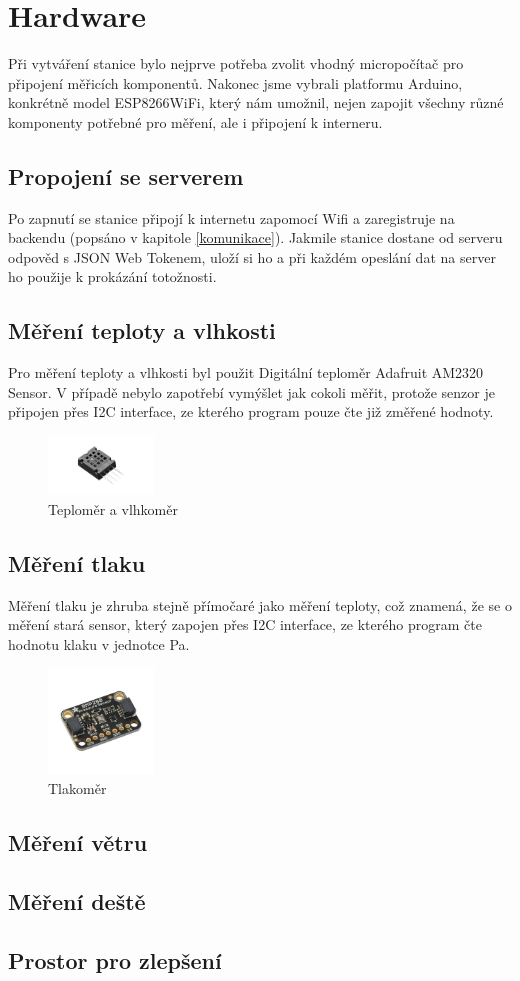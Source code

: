 \section{Hardware}
Při vytváření stanice bylo nejprve potřeba zvolit vhodný micropočítač pro připojení měřicích komponentů. Nakonec jsme vybrali platformu Arduino,
konkrétně model ESP8266WiFi, který nám umožnil, nejen zapojit všechny různé komponenty potřebné pro měření, ale i připojení k interneru.

\subsection{Propojení se serverem}
Po zapnutí se stanice připojí k internetu zapomocí Wifi a zaregistruje na backendu (popsáno v kapitole \ref{komunikace}). Jakmile stanice dostane od serveru odpověd s 
JSON Web Tokenem, uloží si ho a při každém opeslání dat na server ho použije k prokázání totožnosti.

\subsection{Měření teploty a vlhkosti}
Pro měření teploty a vlhkosti byl použit Digitální teploměr Adafruit AM2320 Sensor\cite{teplomer}. V případě nebylo zapotřebí vymýšlet jak cokoli měřit,
protože senzor je připojen přes I2C interface, ze kterého program pouze čte již změřené hodnoty.
\begin{figure}[h] 
    \centering
    \includegraphics[width=0.25\textwidth]{images/Adafruit-AM2320.jpg}
    \caption{Teploměr a vlhkoměr}
\end{figure}

\subsection{Měření tlaku}
Měření tlaku je zhruba stejně přímočaré jako měření teploty, což znamená, že se o měření stará sensor\cite{tlakoměr},
který zapojen přes I2C interface, ze kterého program čte hodnotu klaku v jednotce Pa.

\begin{figure}[h] 
    \centering
    \includegraphics[width=0.25\textwidth]{images/Adafruit-BMP280.jpg}
    \caption{Tlakoměr}
\end{figure}
\subsection{Měření větru}

\subsection{Měření deště}

\subsection{Prostor pro zlepšení}
